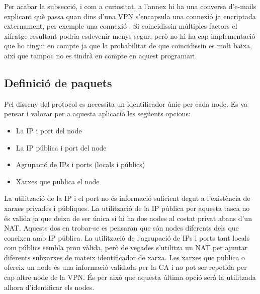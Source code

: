 Per acabar la subsecció, i com a curiositat, a l'annex  hi ha una conversa d'e-mails explicant què passa quan dins d'una VPN s'encapsula una connexió ja encriptada externament, per exemple una connexió . Si coincidissin múltiples factors el xifratge resultant podria esdevenir menys segur, però no hi ha cap implementació que ho tingui en compte ja que la probabilitat de que coincidissin es molt baixa, així que tampoc no es tindrà en compte en aquest programari.

\subsection{Definició de paquets}
Pel disseny del protocol es necessita un identificador únic per cada node. Es va pensar i valorar per a aquesta aplicació les següents opcions:
\begin{itemize}
\item La IP i port del node
\item La IP pública i port del node
\item Agrupació de IPs i ports (locals i públics)
\item Xarxes que publica el node
\end{itemize}
La utilització de la IP i el port no és informació suficient degut a l'existència de xarxes privades i públiques. %
La utilització de la IP pública per aquesta tasca no és valida ja que deixa de ser única si hi ha dos nodes al costat privat abans d'un NAT. Aquests dos en trobar-se es pensaran que són nodes diferents dels que coneixen amb IP pública.
La utilització de l'agrupació de IPs i ports tant locals com públics sembla prou vàlida, però de vegades s'utilitza un NAT per ajuntar diferents subxarxes de mateix identificador de xarxa.
Les xarxes que publica o ofereix un node és una informació validada per la CA i no pot ser repetida per cap altre node de la VPN. És per això que aquesta última opció serà la utilitzada alhora d'identificar els nodes.

